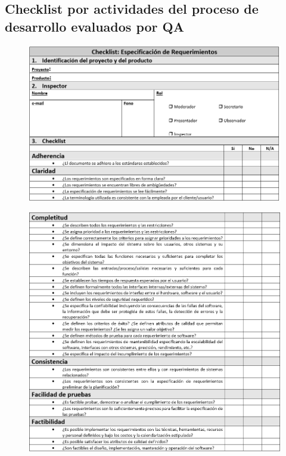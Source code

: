 \subsection{Checklist por actividades del proceso de desarrollo evaluados por QA}

\begin{figure}[H]
\centering
\includegraphics[width=1\textwidth]{figures/anexos/3-2-1a.PNG}
\end{figure}

\begin{figure}[H]
\centering
\includegraphics[width=1\textwidth]{figures/anexos/3-2-1b.PNG}
\end{figure}

